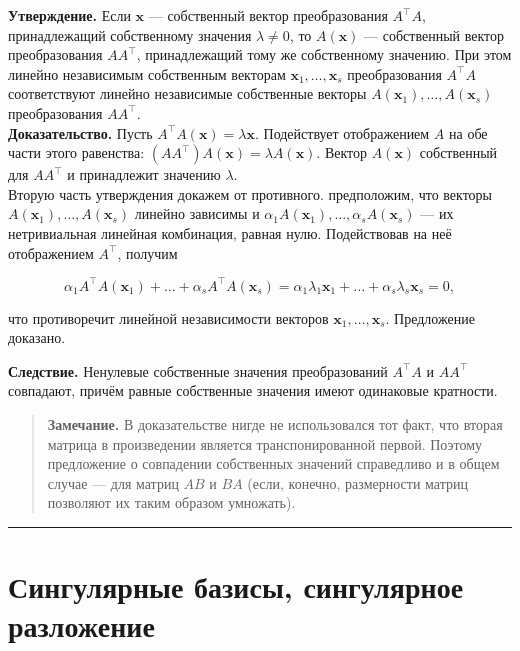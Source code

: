 \documentclass[11pt,a4paper]{article}
\begin{document}
\textbf{Утверждение.} Если \(\mathbf{x}\) --- собственный вектор
преобразования \(A^\top A\), принадлежащий собственному значения
\(\lambda \ne 0\), то \(A(\mathbf{x})\) --- собственный вектор
преобразования \(A A^\top\), принадлежащий тому же собственному
значению. При этом линейно независимым собственным векторам
\(\mathbf{x}_1, \ldots, \mathbf{x}_s\) преобразования \(A^\top A\)
соответствуют линейно независимые собственные векторы
\(A(\mathbf{x}_1), \ldots, A(\mathbf{x}_s)\) преобразования
\(A A^\top\).\\
\textbf{Доказательство.} Пусть
\(A^\top A (\mathbf{x}) = \lambda \mathbf{x}\). Подействует отображением
\(A\) на обе части этого равенства:
\((A A^\top) A(\mathbf{x}) = \lambda A(\mathbf{x})\). Вектор
\(A(\mathbf{x})\) собственный для \(A A^\top\) и принадлежит значению
\(\lambda\).\\
Вторую часть утверждения докажем от противного. предположим, что векторы
\(A(\mathbf{x}_1), \ldots, A(\mathbf{x}_s)\) линейно зависимы и
\(\alpha_1 A(\mathbf{x}_1), \ldots, \alpha_s A(\mathbf{x}_s)\) --- их
нетривиальная линейная комбинация, равная нулю. Подействовав на неё
отображением \(A^\top\), получим

\[
  \alpha_1 A^\top A(\mathbf{x}_1) + \ldots + \alpha_s A^\top A(\mathbf{x}_s) = \alpha_1 \lambda_1 \mathbf{x}_1 + \ldots + \alpha_s  \lambda_s \mathbf{x}_s = 0,
\]

что противоречит линейной независимости векторов
\(\mathbf{x}_1, \ldots, \mathbf{x}_s\). Предложение доказано.

\textbf{Следствие.} Ненулевые собственные значения преобразований
\(A^\top A\) и \(A A^\top\) совпадают, причём равные собственные
значения имеют одинаковые кратности.

\begin{quote}
\textbf{Замечание.} В доказательстве нигде не использовался тот факт,
что вторая матрица в произведении является транспонированной первой.
Поэтому предложение о совпадении собственных значений справедливо и в
общем случае --- для матриц \(AB\) и \(BA\) (если, конечно, размерности
матриц позволяют их таким образом умножать).
\end{quote}

    \begin{center}\rule{0.5\linewidth}{0.5pt}\end{center}

    \hypertarget{ux441ux438ux43dux433ux443ux43bux44fux440ux43dux44bux435-ux431ux430ux437ux438ux441ux44b-ux441ux438ux43dux433ux443ux43bux44fux440ux43dux43eux435-ux440ux430ux437ux43bux43eux436ux435ux43dux438ux435}{%
\section{Сингулярные базисы, сингулярное
разложение}\label{ux441ux438ux43dux433ux443ux43bux44fux440ux43dux44bux435-ux431ux430ux437ux438ux441ux44b-ux441ux438ux43dux433ux443ux43bux44fux440ux43dux43eux435-ux440ux430ux437ux43bux43eux436ux435ux43dux438ux435}}
\end{document}
